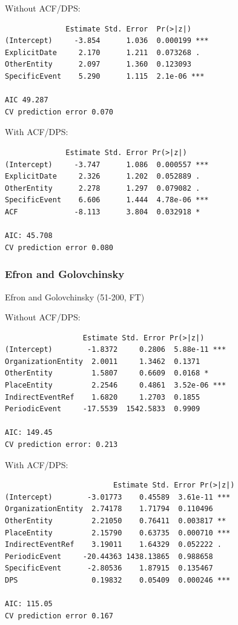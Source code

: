 \documentclass{sig-alternate}
\begin{document}
Without ACF/DPS:
\begin{verbatim}
              Estimate Std. Error  Pr(>|z|)    
(Intercept)     -3.854      1.036  0.000199 ***
ExplicitDate     2.170      1.211  0.073268 .  
OtherEntity      2.097      1.360  0.123093    
SpecificEvent    5.290      1.115  2.1e-06 ***

AIC 49.287
CV prediction error 0.070
\end{verbatim}

With ACF/DPS:
\begin{verbatim}
              Estimate Std. Error Pr(>|z|)    
(Intercept)     -3.747      1.086  0.000557 ***
ExplicitDate     2.326      1.202  0.052889 .  
OtherEntity      2.278      1.297  0.079082 .  
SpecificEvent    6.606      1.444  4.78e-06 ***
ACF             -8.113      3.804  0.032918 *  

AIC: 45.708
CV prediction error 0.080
\end{verbatim}

\subsubsection{Efron and Golovchinsky}


Efron and Golovchinsky (51-200, FT)

Without ACF/DPS:
\begin{verbatim}
                  Estimate Std. Error Pr(>|z|)    
(Intercept)        -1.8372     0.2806  5.88e-11 ***
OrganizationEntity  2.0011     1.3462  0.1371    
OtherEntity         1.5807     0.6609  0.0168 *  
PlaceEntity         2.2546     0.4861  3.52e-06 ***
IndirectEventRef    1.6820     1.2703  0.1855    
PeriodicEvent     -17.5539  1542.5833  0.9909    

AIC: 149.45
CV prediction error: 0.213
\end{verbatim}

With ACF/DPS:
\begin{verbatim}
                         Estimate Std. Error Pr(>|z|)    
(Intercept)        -3.01773    0.45589  3.61e-11 ***
OrganizationEntity  2.74178    1.71794  0.110496    
OtherEntity         2.21050    0.76411  0.003817 ** 
PlaceEntity         2.15790    0.63735  0.000710 ***
IndirectEventRef    3.19011    1.64329  0.052222 .  
PeriodicEvent     -20.44363 1438.13865  0.988658    
SpecificEvent      -2.80536    1.87915  0.135467    
DPS                 0.19832    0.05409  0.000246 ***

AIC: 115.05
CV prediction error 0.167
\end{verbatim}
\end{document}
